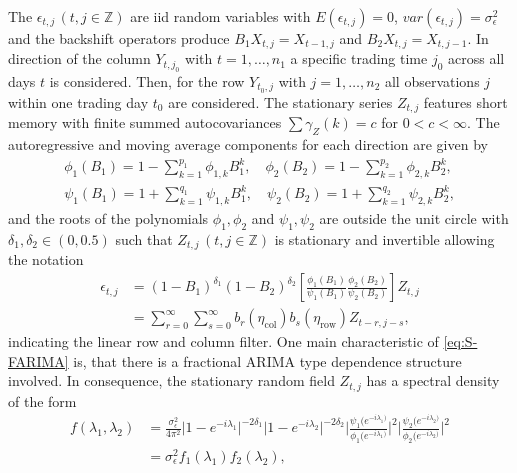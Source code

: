 \documentclass[12pt]{article}
\begin{document}
The \(\epsilon_{t,j}\,(t,j \in \mathbb{Z})\) are iid random variables with \(E(\epsilon_{t,j}) = 0\), \( var(\epsilon_{t,j}) = \sigma_{\epsilon}^{2}  \) and the backshift operators produce \(B_1 X_{t,j} = X_{t-1,j}\) and \(B_2 X_{t,j} = X_{t,j-1}\).
In direction of the column \( Y_{t,j_{0}}\) with \( t=1,\ldots,n_{1} \) a specific trading time \(j_{0}\) across all days \(t\) is considered. 
Then, for the row \( Y_{t_{0},j}\) with \(j=1,\ldots,n_{2} \) all observations \(j\) within one trading day \(t_0\) are considered.
The stationary series \(Z_{t,j}\) features short memory with finite summed autocovariances \(\sum \gamma_{Z}(k) = c\) for \(0 < c < \infty\).
The autoregressive and moving average components for each direction are given by
\begin{equation}
\begin{split}
	\phi_1(B_1) = 1 - \sum_{k=1}^{p_1} \phi_{1,k} B_1^k, \quad \phi_2(B_2) = 1 - \sum_{k=1}^{p_2} \phi_{2,k} B_2^k, \\
	\psi_1(B_1) = 1 + \sum_{k=1}^{q_1} \psi_{1,k} B_1^k, \quad \psi_2(B_2) = 1 + \sum_{k=1}^{q_2} \psi_{2,k} B_2^k,
	\end{split}	
\end{equation}
and the roots of the polynomials \( \phi_1,\phi_2 \) and \( \psi_1,\psi_2 \) are outside the unit circle with \(\delta_1,\delta_2 \in (0,0.5) \) such that  \(Z_{t,j} \, (t,j \in \mathbb{Z})\) is stationary and invertible allowing the notation 
\begin{equation}
\begin{split}
\epsilon_{t,j} & = (1-B_1)^{\delta_1} (1-B_2)^{\delta_2} \left[ \frac{\phi_1(B_1)}{\psi_1(B_1)}  \frac{\phi_2(B_2)}{\psi_2(B_2)} \right] Z_{t,j} \\
& = \sum_{r=0}^{\infty} \sum_{s=0}^{\infty} b_r(\eta_{\text{col}}) b_s(\eta_{\text{row}}) Z_{t-r,j-s},
\end{split}
\label{eq:error.repr}
\end{equation}
indicating the linear row and column filter.
One main characteristic of \eqref{eq:S-FARIMA} is, that there is a fractional ARIMA type dependence structure involved.
In consequence, the stationary random field \(Z_{t,j}\) has a spectral density of the form
\begin{equation}
\label{eq:2.1e}
\begin{split}
f(\lambda_1, \lambda_2) & = \frac{\sigma_{\epsilon}^{2}}{4 \pi^{2}} \big|1-e^{-i\lambda_1}\big|^{-2 \delta_1} \big|1-e^{-i\lambda_2}\big|^{-2 \delta_2} \Bigg|\frac{\psi_1 (e^{-i\lambda_1)}} {\phi_1 (e^{-i\lambda_1)}}\Bigg|^{2} \Bigg|\frac{\psi_2 (e^{-i\lambda_2)}} {\phi_2 (e^{-i\lambda_2)}}\Bigg|^{2} \\
& = \sigma_{\epsilon}^{2} f_1(\lambda_1) f_2(\lambda_2),
\end{split}
\end{equation}
\end{document}
